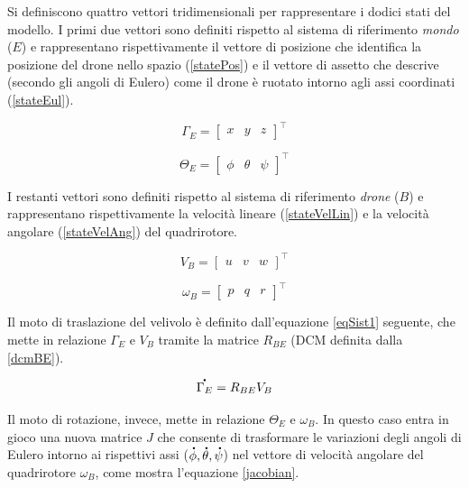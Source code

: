Si definiscono quattro vettori tridimensionali per rappresentare i dodici stati del modello. I primi due vettori sono definiti rispetto al sistema di riferimento \emph{mondo} ($E$) e rappresentano rispettivamente il vettore di posizione che identifica la posizione del drone nello spazio (\ref{statePos}) e il vettore di assetto che descrive (secondo gli angoli di Eulero) come il drone è ruotato intorno agli assi coordinati (\ref{stateEul}).

\begin{equation}
\Gamma_E = \begin{bmatrix}
x & y & z 
\end{bmatrix}^\top
\label{statePos}
\end{equation}

\begin{equation}
\Theta_E = \begin{bmatrix}
\phi & \theta & \psi
\end{bmatrix}^\top
\label{stateEul}
\end{equation}

I restanti vettori sono definiti rispetto al sistema di riferimento \emph{drone} ($B$) e rappresentano rispettivamente la velocità lineare (\ref{stateVelLin}) e la velocità angolare (\ref{stateVelAng}) del quadrirotore.

\begin{equation}
V_B = \begin{bmatrix}
u & v & w
\end{bmatrix}^\top
\label{stateVelLin}
\end{equation}

\begin{equation}
\omega_B = \begin{bmatrix}
p & q & r 
\end{bmatrix}^\top
\label{stateVelAng}
\end{equation}

Il moto di traslazione del velivolo è definito dall'equazione \ref{eqSist1} seguente, che mette in relazione $\Gamma_E$ e $V_B$ tramite la matrice $R_{BE}$ (\acs{DCM} definita dalla \ref{dcmBE}). 

\begin{equation}
	\accentset{\mbox{\large\bfseries .}}{\Gamma_E} = R_{BE}V_B
	\label{eqSist1}
\end{equation}

Il moto di rotazione, invece, mette in relazione $\Theta_E$ e $\omega_B$. In questo caso entra in gioco una nuova matrice $J$ che consente di trasformare le variazioni degli angoli di Eulero intorno ai rispettivi assi ($\accentset{\mbox{\large\bfseries .}}{\phi}, \accentset{\mbox{\large\bfseries .}}{\theta}, \accentset{\mbox{\large\bfseries .}}{\psi}$) nel vettore di velocità angolare del quadrirotore $\omega_B$, come mostra l'equazione \ref{jacobian}.

